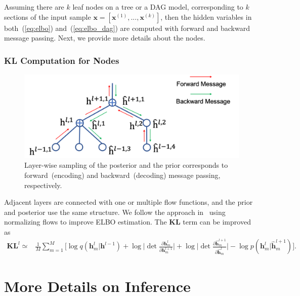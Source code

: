 \documentclass{article}
\begin{document}
Assuming there are $k$ leaf nodes on a tree or a DAG model, corresponding to $k$ sections of the input sample $\mathbf{x} = [\mathbf{x}^{(1)}, ..., \mathbf{x}^{(k)}]$, then the hidden variables in both~(\ref{eq:elbo}) and~(\ref{eq:elbo_dag}) are computed with forward and backward message passing. 
Next, we provide more details about the nodes.


\vspace{-0.1in}
\subsubsection{KL Computation for Nodes}
 

\begin{figure}[H]
\begin{center}
 \includegraphics[width=0.6\linewidth]{fig/message.png}
\end{center}
\vspace{-0.2in}
\caption{ {\small  Layer-wise sampling of the posterior and the prior corresponds to forward~(encoding) and backward~(decoding) message passing, respectively.}}
\label{fig:message}
\vspace{-0.15in}
\end{figure}

Adjacent layers are connected with one or multiple flow functions, and the prior and posterior use the same structure.  We follow the approach in~\cite{rezende2015variational,berg2018sylvester}  using normalizing flows to improve ELBO estimation. The $\mathbf{KL}$ term can be improved as
\begin{align} \label{eq:kl_est}
\mathbf{KL}^l
\simeq & \frac{1}{M}\sum_{m=1}^M\bigg[ \log q(\mathbf{h}^{l}_m|\mathbf{h}^{l-1}) +\log \bigg|\det \frac{\partial \mathbf{h}^{l}_m}{\partial \mathbf{h}^{l+1}_m}\bigg| + \log \bigg|\det \frac{\partial \widehat{\mathbf{h}}^{l+1}_m}{\partial \widehat{\mathbf{h}}^{l}_m}\bigg|   - \log p(\mathbf{h}^{l}_m|\widehat{\mathbf{h}}_m^{l+1}) \bigg].
\end{align}

\section{More Details on Inference}
\end{document}
